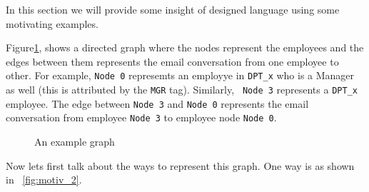 In this section we will provide some insight of designed language
using some motivating examples.

\begin{example}{\rm
Figure\ref{fig:motiv_1}, shows a directed graph where the nodes represent the 
  employees
and the edges between them represents the email conversation from one employee 
to other. For example, {\tt Node 0} represemts an employye in {\tt DPT\_x} who 
is a Manager as well (this is attributed by the {\tt MGR} tag). Similarly, {\tt 
  Node 3} represents a {\tt DPT\_x} employee. The edge between {\tt Node 3} and 
  {\tt Node 0} represents the email conversation from employee {\tt Node 3} to 
employee node {\tt Node 0}.

\begin{figure}
  \begin{center}
  \end{center}
  \caption{An example graph}
  \label{fig:motiv_1}
\end{figure}

  Now lets first talk about the ways to represent this graph. One way is as 
    shown in ~\ref{fig:motiv_2}. 

}
\end{example}
